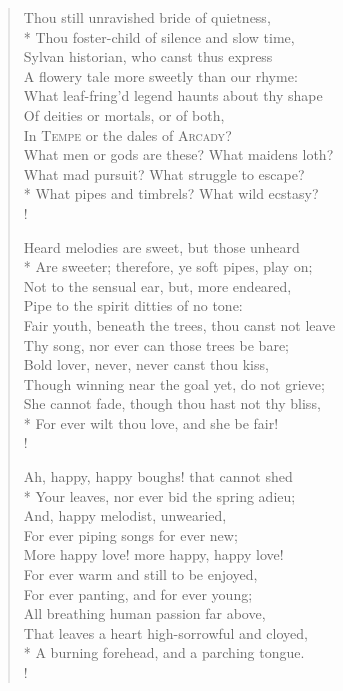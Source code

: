 \settowidth{\versewidth}{Fair youth, beneath the trees, thou canst not leave}
\begin{verse}
Thou still unravished bride of quietness,\\*
\vin Thou foster-child of silence and slow time,\\
Sylvan historian, who canst thus express\\
\vin A flowery tale more sweetly than our rhyme:\\
What leaf-fring'd legend haunts about thy shape\\
\vin Of deities or mortals, or of both,\\
\vin \vin In \textsc{Tempe} or the dales of \textsc{Arcady}?\\
\vin What men or gods are these? What maidens loth?\\
What mad pursuit? What struggle to escape?\\*
\vin \vin What pipes and timbrels? What wild ecstasy?\\!

Heard melodies are sweet, but those unheard\\*
\vin Are sweeter; therefore, ye soft pipes, play on;\\
Not to the sensual ear, but, more endeared,\\
\vin Pipe to the spirit ditties of no tone:\\
Fair youth, beneath the trees, thou canst not leave\\
\vin Thy song, nor ever can those trees be bare;\\
\vin \vin Bold lover, never, never canst thou kiss,\\
Though winning near the goal yet, do not grieve;\\
\vin She cannot fade, though thou hast not thy bliss,\\*
\vin \vin For ever wilt thou love, and she be fair!\\!

Ah, happy, happy boughs! that cannot shed\\*
\vin Your leaves, nor ever bid the spring adieu;\\
And, happy melodist, unwearied,\\
\vin For ever piping songs for ever new;\\
More happy love! more happy, happy love!\\
\vin For ever warm and still to be enjoyed,\\
\vin \vin For ever panting, and for ever young;\\
All breathing human passion far above,\\
\vin That leaves a heart high-sorrowful and cloyed,\\*
\vin \vin A burning forehead, and a parching tongue.\\!


\end{verse}
